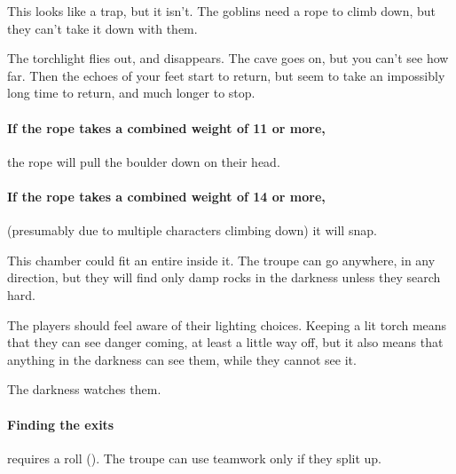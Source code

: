 \begin{multicols}{2}

This looks like a trap, but it isn't.
The goblins need a rope to climb down, but they can't take it down with them.

\begin{boxtext}
  The torchlight flies out, and disappears.
  The cave goes on, but you can't see how far.
  Then the echoes of your feet start to return, but seem to take an impossibly long time to return, and much longer to stop.
\end{boxtext}

\paragraph{If the rope takes a combined \gls{weight} of 11 or more,}
the rope will pull the boulder down on their head.

\paragraph{If the rope takes a combined \gls{weight} of 14 or more,}
(presumably due to multiple characters climbing down) it will snap.


This chamber could fit an entire  inside it.
The troupe can go anywhere, in any direction, but they will find only damp rocks in the darkness unless they search hard.


The players should feel aware of their lighting choices.
Keeping a lit torch means that they can see danger coming, at least a little way off, but it also means that anything in the darkness can see them, while they cannot see it.

The darkness watches them.

\paragraph{Finding the exits}
requires a  roll (\tn[9]).
The troupe can use teamwork%
only if they split up.


\end{multicols}
